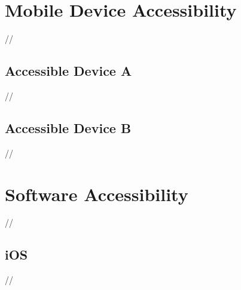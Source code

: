 \section{Mobile Device Accessibility}


//


\subsection{Accessible Device A}


//


\subsection{Accessible Device B}


//


\section{Software Accessibility}

//


\subsection{iOS}

//



